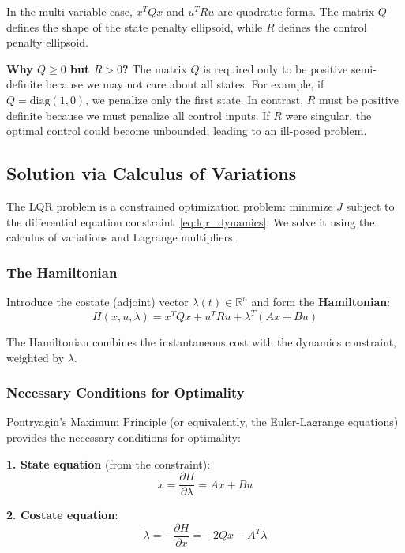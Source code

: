 In the multi-variable case, $x^T Q x$ and $u^T R u$ are quadratic forms. The matrix $Q$ defines the shape of the state penalty ellipsoid, while $R$ defines the control penalty ellipsoid.

\textbf{Why $Q \geq 0$ but $R > 0$?} The matrix $Q$ is required only to be positive semi-definite because we may not care about all states. For example, if $Q = \text{diag}(1, 0)$, we penalize only the first state. In contrast, $R$ must be positive definite because we must penalize all control inputs. If $R$ were singular, the optimal control could become unbounded, leading to an ill-posed problem.

\subsection{Solution via Calculus of Variations}

The LQR problem is a constrained optimization problem: minimize $J$ subject to the differential equation constraint~\eqref{eq:lqr_dynamics}. We solve it using the calculus of variations and Lagrange multipliers.

\subsubsection{The Hamiltonian}

Introduce the costate (adjoint) vector $\lambda(t) \in \mathbb{R}^n$ and form the \textbf{Hamiltonian}:
\begin{equation}
H(x, u, \lambda) = x^T Q x + u^T R u + \lambda^T (Ax + Bu)
\label{eq:hamiltonian}
\end{equation}

The Hamiltonian combines the instantaneous cost with the dynamics constraint, weighted by $\lambda$.

\subsubsection{Necessary Conditions for Optimality}

Pontryagin's Maximum Principle (or equivalently, the Euler-Lagrange equations) provides the necessary conditions for optimality:

\textbf{1. State equation} (from the constraint):
\begin{equation}
\dot{x} = \frac{\partial H}{\partial \lambda} = Ax + Bu
\end{equation}

\textbf{2. Costate equation}:
\begin{equation}
\dot{\lambda} = -\frac{\partial H}{\partial x} = -2Qx - A^T \lambda
\label{eq:costate}
\end{equation}

